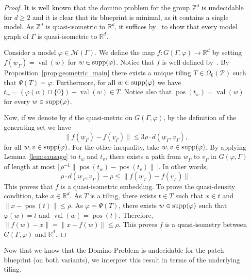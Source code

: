 \documentclass{article}
\theoremstyle{definition}
\theoremstyle{definition}
\newcommand{\Z}{\mathbb{Z}}
\newcommand{\ZZ}{\mathbb{Z}}
\newcommand{\R}{\mathbb{R}}
\newcommand{\RR}{\mathbb{R}}
\newcommand{\M}{\mathcal{M}}
\newcommand{\PP}{\mathcal{P}}
\newcommand{\norm}[1]{\|{#1}\|}
\newcommand{\val}{\operatorname{val}}
\newcommand{\pos}{\operatorname{pos}}
\newcommand{\supp}{\textnormal{supp}}
\begin{document}
\begin{proof}
It is well known that the domino problem for the group $\ZZ^d$ is undecidable for $d\geq 2$ and it is clear that its blueprint is minimal, as it contains a single model. As $\ZZ^d$ is quasi-isometric to $\RR^d$, it suffices by~ to show that every model graph of $\Gamma$ is quasi-isometric to $\R^d$. 
    
Consider a model $\varphi\in\M(\Gamma)$. We define the map $f\colon G(\Gamma,\varphi)\to \RR^d$ by setting $f(\underline{w}_{\Gamma}) = \val(w)$ for $w \in \supp(\varphi)$. Notice that $f$ is well-defined by~. By Proposition~\ref{prop:geometric_main} there exists a unique tiling $T\in\Omega_0(\PP)$ such that $\Psi(T) = \varphi$. Furthermore, for all $w \in \supp(\varphi)$ we have $t_w = (\varphi(w) \sqcap \{0\})+\val(w) \in T$. Notice also that $\pos(t_w) = \val(w)$ for every $w \in \supp(\varphi)$.

Now, if we denote by $d$ the quasi-metric on $G(\Gamma,\varphi)$, by the definition of the generating set we have
$$\|f(\underline{w}_{\Gamma}) - f(\underline{v}_{\Gamma})\|\leq 3\rho\cdot d(\underline{w}_{\Gamma}, \underline{v}_{\Gamma}),$$
for all $w, v\in\supp(\varphi)$. For the other inequality, take $w,v \in\supp(\varphi)$. By applying Lemma~\ref{lem:sausage} to $t_w$ and $t_v$, there exists a path from $\underline{w}_{\Gamma}$ to $\underline{v}_{\Gamma}$ in $G(\varphi,\Gamma)$ of length at most  $\lceil \rho^{-1}\norm{\pos(t_w) - \pos(t_v)}\rceil$. In other words,
$$\rho\cdot d(\underline{w}_{\Gamma}, \underline{v}_{\Gamma}) - \rho \leq \|f(\underline{w}_{\Gamma}) - f(\underline{v}_{\Gamma})\|.$$
This proves that $f$ is a quasi-isometric embedding. To prove the quasi-density condition, take $x\in\R^d$. As $T$ is a tiling, there exists $t\in T$ such that $x\in t$ and $\|x-\pos(t)\|\leq \rho$. As $\varphi = \Psi(T)$, there exists $w\in\supp(\varphi)$ such that $\varphi(w) = t$ and $\val(w) = \pos(t)$. Therefore, $\norm{f(w)-x} = \norm{x-f(w)}\leq\rho$. This proves $f$ is a quasi-isometry between $G(\Gamma, \varphi)$ and $\R^d$.
\end{proof}

Now that we know that the Domino Problem is undecidable for the patch blueprint (on both variants), we interpret this result in terms of the underlying tiling. \\
\end{document}
